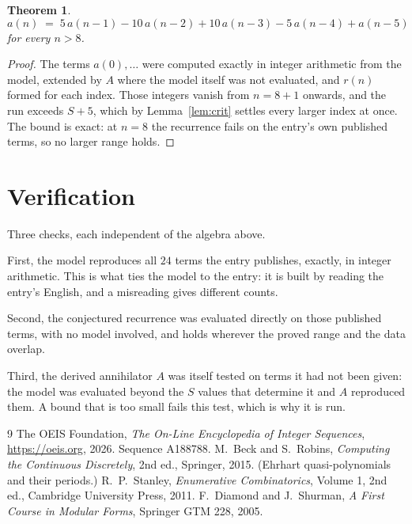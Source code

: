 \documentclass[11pt,a4paper]{article}
\theoremstyle{plain}
\newtheorem{theorem}{Theorem}
\theoremstyle{definition}
\begin{document}
\begin{theorem}
\[
a(n)\;=\;5\,a(n-1) - 10\,a(n-2) + 10\,a(n-3) - 5\,a(n-4) + a(n-5)
\]
for every $n>8$.
\end{theorem}

\begin{proof}
The terms $a(0),\dots$ were computed exactly in integer arithmetic from the model, extended by
$A$ where the model itself was not evaluated, and $r(n)$ formed for each index. Those integers
vanish from $n=8+1$ onwards, and the run exceeds $S+5$, which by
Lemma~\ref{lem:crit} settles every larger index at once. The bound is exact: at $n=8$ the recurrence fails on the entry's own published terms, so no larger range holds.
\end{proof}

\section{Verification}

Three checks, each independent of the algebra above.

First, the model reproduces all $24$ terms the entry publishes, exactly, in integer
arithmetic. This is what ties the model to the entry: it is built by reading the entry's
English, and a misreading gives different counts.

Second, the conjectured recurrence was evaluated directly on those published terms, with no
model involved, and holds wherever the proved range and the data overlap.

Third, the derived annihilator $A$ was itself tested on terms it had not been given: the model
was evaluated beyond the $S$ values that determine it and $A$ reproduced them. A bound that is
too small fails this test, which is why it is run.

\begin{thebibliography}{9}
 The OEIS Foundation, \emph{The On-Line Encyclopedia of Integer
Sequences}, \url{https://oeis.org}, 2026. Sequence A188788.
 M.~Beck and S.~Robins, \emph{Computing the Continuous Discretely},
2nd ed., Springer, 2015. (Ehrhart quasi-polynomials and their periods.)
 R.~P.~Stanley, \emph{Enumerative Combinatorics}, Volume 1, 2nd ed.,
Cambridge University Press, 2011.
 F.~Diamond and J.~Shurman, \emph{A First Course in Modular Forms},
Springer GTM 228, 2005.
\end{thebibliography}
\end{document}

